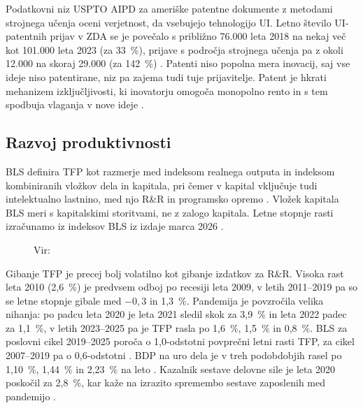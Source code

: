 \documentclass[12pt,a4paper]{article}
\begin{document}
Podatkovni niz USPTO AIPD za ameriške patentne dokumente z metodami strojnega učenja oceni verjetnost, da vsebujejo tehnologijo UI. Letno število UI-patentnih prijav v ZDA se je povečalo s približno 76.000 leta 2018 na nekaj več kot 101.000 leta 2023 (za 33~\%), prijave s področja strojnega učenja pa z okoli 12.000 na skoraj 29.000 (za 142~\%) \parencite{pairolero2025}. Patenti niso popolna mera inovacij, saj vse ideje niso patentirane, niz pa zajema tudi tuje prijavitelje. Patent je hkrati mehanizem izključljivosti, ki inovatorju omogoča monopolno rento in s tem spodbuja vlaganja v nove ideje \parencite[pros.~124--126]{grobovsek2026}.

\subsection{Razvoj produktivnosti}

BLS definira TFP kot razmerje med indeksom realnega outputa in indeksom kombiniranih vložkov dela in kapitala, pri čemer v kapital vključuje tudi intelektualno lastnino, med njo R\&R in programsko opremo \parencite{bls2026tfp}. Vložek kapitala BLS meri s kapitalskimi storitvami, ne z zalogo kapitala. Letne stopnje rasti izračunamo iz indeksov BLS iz izdaje marca 2026 \parencite{fredtfp}.

\begin{figure}[H]
\centering
{}
\caption{Letna rast TFP v zasebnem nekmetijskem poslovnem sektorju ZDA, 2010--2025}
\caption*{\footnotesize Vir: \cite{fredtfp}}
\label{fig:tfp}
\end{figure}

Gibanje TFP je precej bolj volatilno kot gibanje izdatkov za R\&R. Visoka rast leta 2010 (2,6~\%) je predvsem odboj po recesiji leta 2009, v letih 2011--2019 pa so se letne stopnje gibale med $-0{,}3$ in 1,3~\%. Pandemija je povzročila velika nihanja: po padcu leta 2020 je leta 2021 sledil skok za 3,9~\% in leta 2022 padec za 1,1~\%, v letih 2023--2025 pa je TFP rasla po 1,6~\%, 1,5~\% in 0,8~\%. BLS za poslovni cikel 2019--2025 poroča o 1,0-odstotni povprečni letni rasti TFP, za cikel 2007--2019 pa o 0,6-odstotni \parencite{bls2026tfp}. BDP na uro dela je v treh podobdobjih rasel po 1,10~\%, 1,44~\% in 2,23~\% na leto \parencite{fredtfp}. Kazalnik sestave delovne sile je leta 2020 poskočil za 2,8~\%, kar kaže na izrazito spremembo sestave zaposlenih med pandemijo \parencite{fredtfp}.
\end{document}
